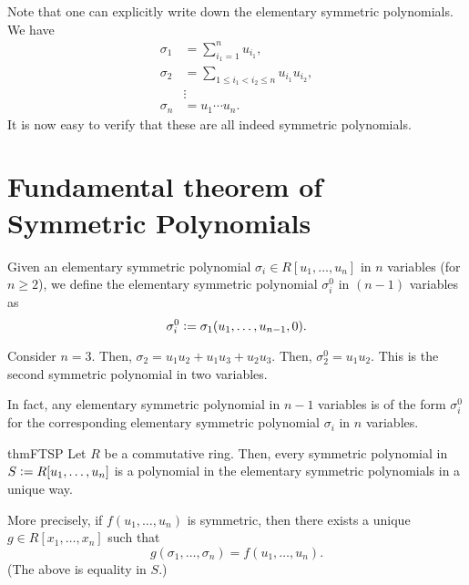 \begin{rem}
    Note that one can explicitly write down the elementary symmetric polynomials. We have
    \begin{align*} 
        \sigma_1 &= \sum_{i_1 = 1}^{n} u_{i_1},\\
        \sigma_2 &= \sum_{1 \le i_1 < i_2 \le n} u_{i_1}u_{i_2},\\
        & \vdots \\
        \sigma_n &= u_1 \cdots u_n.
    \end{align*}
    It is now easy to verify that these are all indeed symmetric polynomials.
\end{rem}

\section{Fundamental theorem of Symmetric Polynomials}

\begin{defn}%
    Given an elementary symmetric polynomial $\sigma_i \in R[u_1, \ldots, u_n]$ in $n$ variables (for $n \ge 2$), we define the elementary symmetric polynomial $\sigma_i^0$ in $(n - 1)$ variables as
    \begin{equation*} 
        \sigma_i^0 \vcentcolon= \sigma_1(u_1, \ldots, u_{n - 1}, 0).
    \end{equation*}
\end{defn}

\begin{ex}
    Consider $n = 3.$ Then, $\sigma_2 = u_1u_2 + u_1u_3 + u_2u_3.$ Then, $\sigma_2^0 = u_1u_2.$ This is the second symmetric polynomial in two variables. 

    In fact, any elementary symmetric polynomial in $n - 1$ variables is of the form $\sigma_i^0$ for the corresponding elementary symmetric polynomial $\sigma_i$ in $n$ variables.
\end{ex}

\begin{restatable}{thm}{FTSP}
\label{thm:FTSP}
    Let $R$ be a commutative ring. Then, every symmetric polynomial in $S \vcentcolon= R[u_1, \ldots, u_n]$ is a polynomial in the elementary symmetric polynomials in a unique way.

    More precisely, if $f(u_1, \ldots, u_n)$ is symmetric, then there exists a unique $g \in R[x_1, \ldots, x_n]$ such that
    \begin{equation*} 
        g(\sigma_1, \ldots, \sigma_n) = f(u_1, \ldots, u_n).
    \end{equation*}
    (The above is equality in $S.$) \hfill\hyperref[thm:FTSP2]{\downsym}
\end{restatable}

